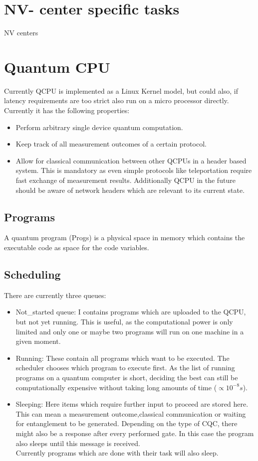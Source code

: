 \documentclass[]{article}
\begin{document}
\section{NV- center specific tasks}
NV centers 
\section{Quantum CPU}
Currently QCPU is implemented as a Linux Kernel model, but could also, if latency requirements are too strict also run on a micro processor directly. Currently it has the following properties:
\begin{itemize}
	\item Perform arbitrary single device quantum computation.
	\item Keep track of all measurement outcomes of a certain protocol.
	\item Allow for classical communication between other QCPUs in a header based system. This is mandatory as even simple protocols like teleportation require fast exchange of measurement results. Additionally QCPU in the future should be aware of network headers which are relevant to its current state.
\end{itemize}
\subsection{Programs}
A quantum program (Progs) is a physical space in memory which contains the executable code as space for the code variables.
\subsection{Scheduling}
There are currently three queues:
\begin{itemize}
	\item Not\_started queue: I contains programs which are uploaded to the QCPU, but not yet running. This is useful, as the computational power is only limited and only one or maybe two programs will run on one machine in a given moment.
	\item Running: These contain all programs which want to be executed. The scheduler chooses which program to execute first. As the list of running programs on a quantum computer is short, deciding the best can still be computationally expensive without taking long amounts of time ($\propto 10^{-8}s$).
	\item Sleeping: Here items which require further input to proceed are stored here. This can mean a measurement outcome,classical communication or waiting for entanglement to be generated. Depending on the type of CQC, there might also be a response after every performed gate. In this case the program also sleeps until this message is received. \\
	Currently programs which are done with their task will also sleep.
\end{itemize}	
\end{document}
